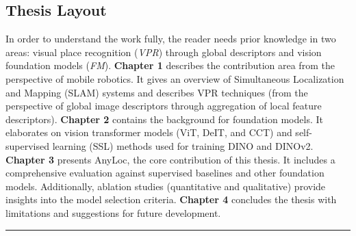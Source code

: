 \documentclass{article}
\begin{document}
    \subsection*{Thesis Layout}
    In order to understand the work fully, the reader needs prior
    knowledge in two areas: visual place recognition (\emph{VPR})
    through global descriptors and vision foundation models
    (\emph{FM}). \textbf{Chapter 1} describes the contribution area
    from the perspective of mobile robotics. It gives an overview of
    Simultaneous Localization and Mapping (SLAM) systems and describes
    VPR techniques (from the perspective of global image descriptors
    through aggregation of local feature descriptors). \textbf{Chapter
    2} contains the background for foundation models. It elaborates on
    vision transformer models (ViT, DeIT, and CCT) and self-supervised
    learning (SSL) methods used for training DINO and DINOv2.
    \textbf{Chapter 3} presents AnyLoc, the core contribution of this
    thesis. It includes a comprehensive evaluation against supervised
    baselines and other foundation models. Additionally, ablation
    studies (quantitative and qualitative) provide insights into the
    model selection criteria. \textbf{Chapter 4} concludes the thesis
    with limitations and suggestions for future development.

    \vspace{3mm}
    \hrule
    \vspace{2mm}
    \printbibliography
\end{document}
